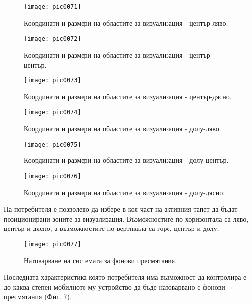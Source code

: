 \begin{figure}[h]
  \centering
  \texttt{[image: pic0071]}
  \caption{Координати и размери на областите за визуализация - център-ляво.}
\label{fig:pic0071}
\end{figure}
\FloatBarrier

\begin{figure}[h]
  \centering
  \texttt{[image: pic0072]}
  \caption{Координати и размери на областите за визуализация - център-център.}
\label{fig:pic0072}
\end{figure}
\FloatBarrier

\begin{figure}[h]
  \centering
  \texttt{[image: pic0073]}
  \caption{Координати и размери на областите за визуализация - център-дясно.}
\label{fig:pic0073}
\end{figure}
\FloatBarrier

\begin{figure}[h]
  \centering
  \texttt{[image: pic0074]}
  \caption{Координати и размери на областите за визуализация - долу-ляво.}
\label{fig:pic0074}
\end{figure}
\FloatBarrier

\begin{figure}[h]
  \centering
  \texttt{[image: pic0075]}
  \caption{Координати и размери на областите за визуализация - долу-център.}
\label{fig:pic0075}
\end{figure}
\FloatBarrier

\begin{figure}[h]
  \centering
  \texttt{[image: pic0076]}
  \caption{Координати и размери на областите за визуализация - долу-дясно.}
\label{fig:pic0076}
\end{figure}
\FloatBarrier

На потребителя е позволено да избере в коя част на активния тапет да бъдат позиционирани зоните за визуализация. Възможностите по хоризонтала са ляво, център и дясно, а възможностите по вертикала са горе, център и долу. 

\begin{figure}[h]
  \centering
  \texttt{[image: pic0077]}
  \caption{Натоварване на системата за фонови пресмятания.}
\label{fig:pic0077}
\end{figure}
\FloatBarrier

Последната характеристика която потребителя има възможност да контролира е до каква степен мобилното му устройство да бъде натоварвано с фонови пресмятания (Фиг. \ref{fig:pic0077}).

